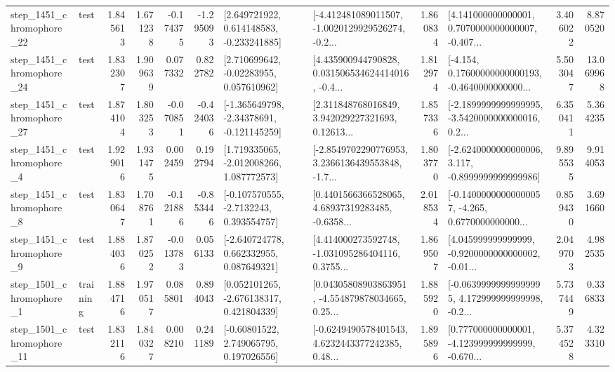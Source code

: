 \begin{tabular}{llrrrrllrlrr}
 step\_1451\_chromophore\_22 &      test &      1.845613 &    1.671238 &     -0.174375 & -1.295093 &    [2.649721922, 0.614148583, -0.233241885] &  [-4.412481089011507, -1.0020129929526274, -0.2... &       1.860834 &  [4.141000000000001, 0.7070000000000007, -0.407... &            3.406022 &          8.870520 \\
 step\_1451\_chromophore\_24 &      test &      1.832307 &    1.909639 &      0.077332 &  0.822782 &     [2.710699642, -0.02283955, 0.057610962] &  [4.435900944790828, 0.031506534624414016, -0.4... &       1.812974 &  [-4.154, 0.17600000000000193, -0.4640000000000... &            5.503047 &         13.069968 \\
 step\_1451\_chromophore\_27 &      test &      1.874104 &    1.803253 &     -0.070851 & -0.424036 &   [-1.365649798, -2.34378691, -0.121145259] &  [2.311848768016849, 3.942029227321693, 0.12613... &       1.857336 &  [-2.1899999999999995, -3.5420000000000016, 0.2... &            6.350411 &          5.364235 \\
  step\_1451\_chromophore\_4 &      test &      1.929016 &    1.931475 &      0.002459 &  0.192794 &    [1.719335065, -2.012008266, 1.087772573] &  [-2.8549702290776953, 3.2366136439553848, -1.7... &       1.803770 &  [-2.6240000000000006, 3.117, -0.8999999999999986] &            9.895535 &          9.914053 \\
  step\_1451\_chromophore\_8 &      test &      1.830647 &    1.708761 &     -0.121886 & -0.853446 &     [-0.107570555, -2.7132243, 0.393554757] &  [0.4401566366528065, 4.68937319283485, -0.6358... &       2.018534 &  [-0.14000000000000057, -4.265, 0.6770000000000... &            0.859430 &          3.691660 \\
  step\_1451\_chromophore\_9 &      test &      1.884036 &    1.870252 &     -0.013783 &  0.056133 &    [-2.640724778, 0.662332955, 0.087649321] &  [4.414000273592748, -1.031095286404116, 0.3755... &       1.869507 &  [4.045999999999999, -0.9200000000000002, -0.01... &            2.049703 &          4.982535 \\
  step\_1501\_chromophore\_1 &  training &      1.884716 &    1.970517 &      0.085801 &  0.894043 &    [0.052101265, -2.676138317, 0.421804339] &  [0.04305808903863951, -4.554879878034665, 0.25... &       1.885920 &  [-0.06399999999999995, 4.172999999999998, -0.2... &            5.737449 &          0.336833 \\
 step\_1501\_chromophore\_11 &      test &      1.832116 &    1.840327 &      0.008210 &  0.241189 &     [-0.60801522, 2.749065795, 0.197026556] &  [-0.6249490578401543, 4.6232443377242385, 0.48... &       1.895896 &  [0.777000000000001, -4.123999999999999, -0.670... &            5.374528 &          4.323310 \\

\end{tabular}

